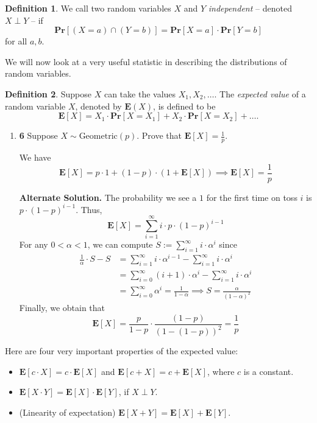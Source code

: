 \documentclass[12pt]{article}
\theoremstyle{plain}
\theoremstyle{definition}
\newtheorem{defn}{Definition}[section]
\theoremstyle{remark}
\renewcommand{\Pr}{\textbf{Pr}}
\newcommand{\E}{\textbf{E}}
\newcommand{\pts}[1]{\lbrack\textbf{#1}\rbrack}
\begin{document}
\begin{defn}
We call two random variables $X$ and $Y$ \emph{independent} -- denoted $X\perp Y$ -- if \[\Pr[(X=a)\cap(Y=b)]=\Pr[X=a]\cdot\Pr[Y=b]\] for all $a,b$.
\end{defn}

We will now look at a very useful statistic in describing the distributions of random variables.

\begin{defn}
Suppose $X$ can take the values $X_1,X_2,\dots$. The \emph{expected value} of a random variable $X$, denoted by $\E(X)$, is defined to be \[\E[X]=X_1\cdot\Pr[X=X_1]+X_2\cdot\Pr[X=X_2]+\dots.\]
\end{defn}

\begin{enumerate}
\item \pts{6} Suppose $X\sim\text{Geometric}(p)$. Prove that $\E[X]=\frac1p$.

\begin{tcolorbox}
We have \[\E[X]=p\cdot1+(1-p)\cdot(1+\E[X])\implies\E[X]=\frac1p\]

\textbf{Alternate Solution.} The probability we see a $1$ for the first time on toss $i$ is $p\cdot(1-p)^{i-1}$. Thus, \[\E[X]=\sum_{i=1}^\infty i\cdot p\cdot(1-p)^{i-1}\] For any $0<\alpha<1$, we can compute $S:=\sum_{i=1}^\infty i\cdot\alpha^i$ since \begin{align*}\frac1\alpha\cdot S-S&=\sum_{i=1}^\infty i\cdot\alpha^{i-1}-\sum_{i=1}^\infty i\cdot\alpha^i\\&=\sum_{i=0}^\infty(i+1)\cdot\alpha^i-\sum_{i=1}^\infty i\cdot\alpha^i\\&=\sum_{i=0}^\infty\alpha^i=\frac1{1-\alpha}\implies S=\frac{\alpha}{(1-\alpha)^2}\end{align*} Finally, we obtain that \[\E[X]=\frac{p}{1-p}\cdot\frac{(1-p)}{(1-(1-p))^2}=\frac1p\]
\end{tcolorbox}

\end{enumerate}

Here are four very important properties of the expected value:

\begin{itemize}
\item $\E[c\cdot X]=c\cdot\E[X]$ and $\E[c+X]=c+\E[X]$, where $c$ is a constant.

\item $\E[X\cdot Y]=\E[X]\cdot\E[Y]$, if $X\perp Y$.

\item (Linearity of expectation) $\E[X+Y]=\E[X]+\E[Y]$.
\end{itemize}
\end{document}

